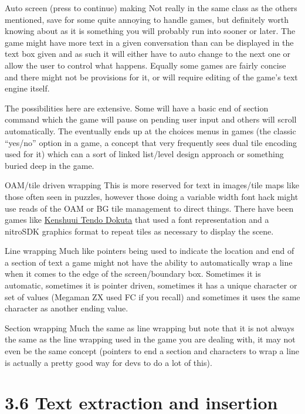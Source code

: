 \documentclass[
]{book}
\begin{document}
Auto screen (press to continue) making Not really in the same class as the others mentioned, save for some quite annoying to handle games, but definitely worth knowing about as it is something you will probably run into sooner or later. The game might have more text in a given conversation than can be displayed in the text box given and as such it will either have to auto change to the next one or allow the user to control what happens. Equally some games are fairly concise and there might not be provisions for it, or will require editing of the game's text engine itself.

The possibilities here are extensive. Some will have a basic end of section command which the game will pause on pending user input and others will scroll automatically. The eventually ends up at the choices menus in games (the classic ``yes/no'' option in a game, a concept that very frequently sees dual tile encoding used for it) which can a sort of linked list/level design approach or something buried deep in the game.

OAM/tile driven wrapping This is more reserved for text in images/tile maps like those often seen in puzzles, however those doing a variable width font hack might use reads of the OAM or BG tile management to direct things. There have been games like \href{http://gbatemp.net/topic/320192-japanese-programming-madness/}{Kenshuui Tendo Dokuta} that used a font representation and a nitroSDK graphics format to repeat tiles as necessary to display the scene.

Line wrapping Much like pointers being used to indicate the location and end of a section of text a game might not have the ability to automatically wrap a line when it comes to the edge of the screen/boundary box. Sometimes it is automatic, sometimes it is pointer driven, sometimes it has a unique character or set of values (Megaman ZX used FC if you recall) and sometimes it uses the same character as another ending value.

Section wrapping Much the same as line wrapping but note that it is not always the same as the line wrapping used in the game you are dealing with, it may not even be the same concept (pointers to end a section and characters to wrap a line is actually a pretty good way for devs to do a lot of this).

\hypertarget{text-extraction-and-insertion}{%
\section{3.6 Text extraction and insertion}\label{text-extraction-and-insertion}}
\end{document}

